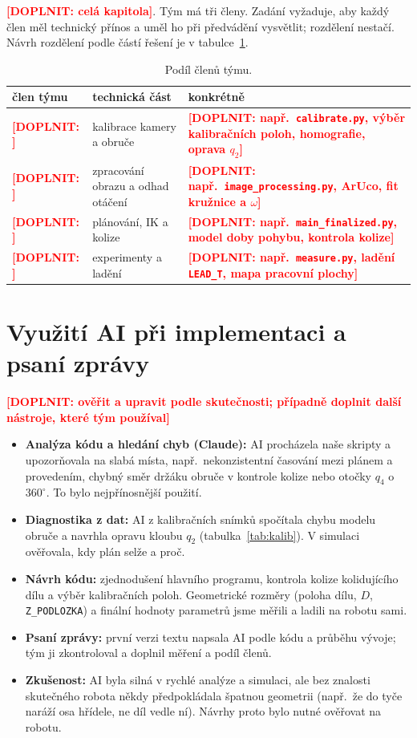 \documentclass[11pt,a4paper]{article}
\newcommand{\doplnit}[1]{\textcolor{red}{\textbf{[DOPLNIT: #1]}}}
\begin{document}
\doplnit{celá kapitola}. Tým má tři členy. Zadání vyžaduje, aby každý člen měl technický přínos a uměl ho při
předvádění vysvětlit; rozdělení  nestačí. Návrh rozdělení
podle částí řešení je v tabulce~\ref{tab:podil}.

\begin{table}[ht]
\centering
\begin{tabularx}{\linewidth}{@{}l l X@{}}
\toprule
člen týmu & technická část & konkrétně \\
\midrule
\doplnit{} & kalibrace kamery a obruče & \doplnit{např.\ \texttt{calibrate.py}, výběr kalibračních poloh, homografie, oprava $q_2$} \\
\doplnit{} & zpracování obrazu a odhad otáčení & \doplnit{např.\ \texttt{image\_processing.py}, ArUco, fit kružnice a $\omega$} \\
\doplnit{} & plánování, IK a kolize & \doplnit{např.\ \texttt{main\_finalized.py}, model doby pohybu, kontrola kolize} \\
\doplnit{} & experimenty a ladění & \doplnit{např.\ \texttt{measure.py}, ladění \texttt{LEAD\_T}, mapa pracovní plochy} \\
\bottomrule
\end{tabularx}
\caption{Podíl členů týmu.}
\label{tab:podil}
\end{table}

\section{Využití AI při implementaci a psaní zprávy}

\doplnit{ověřit a upravit podle skutečnosti; případně doplnit další nástroje, které tým používal}

\begin{itemize}
  \item \textbf{Analýza kódu a hledání chyb (Claude):} AI procházela naše skripty a upozorňovala
        na slabá místa, např.\ nekonzistentní časování mezi plánem a provedením, chybný směr
        držáku obruče v kontrole kolize nebo otočky $q_4$ o $360^\circ$. To bylo nejpřínosnější
        použití.
  \item \textbf{Diagnostika z dat:} AI z kalibračních snímků spočítala chybu modelu obruče
        a navrhla opravu kloubu $q_2$ (tabulka~\ref{tab:kalib}). V simulaci ověřovala, kdy plán
        selže a proč.
  \item \textbf{Návrh kódu:} zjednodušení hlavního programu, kontrola kolize kolidujícího dílu
        a výběr kalibračních poloh. Geometrické rozměry (poloha dílu, $D$, \texttt{Z\_PODLOZKA})
        a finální hodnoty parametrů jsme měřili a ladili na robotu sami.
  \item \textbf{Psaní zprávy:} první verzi textu napsala AI podle kódu a průběhu vývoje; tým ji
        zkontroloval a doplnil měření a podíl členů.
  \item \textbf{Zkušenost:} AI byla silná v rychlé analýze a simulaci, ale bez znalosti
        skutečného robota někdy předpokládala špatnou geometrii (např.\ že do tyče naráží osa
        hřídele, ne díl vedle ní). Návrhy proto bylo nutné ověřovat na robotu.
\end{itemize}
\end{document}
